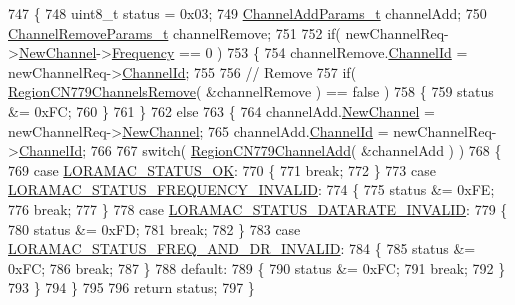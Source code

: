\begin{DoxyCode}
747 \{
748     uint8\_t status = 0x03;
749     \mbox{\hyperlink{structs_channel_add_params}{ChannelAddParams\_t}} channelAdd;
750     \mbox{\hyperlink{structs_channel_remove_params}{ChannelRemoveParams\_t}} channelRemove;
751 
752     \textcolor{keywordflow}{if}( newChannelReq->\mbox{\hyperlink{structs_new_channel_req_params_afc31493a105479490228fd896b20b45c}{NewChannel}}->\mbox{\hyperlink{structs_channel_params_ade3d190636488dad9a89b19446b7acf1}{Frequency}} == 0 )
753     \{
754         channelRemove.\mbox{\hyperlink{structs_channel_remove_params_ae23f953dc29c360e56a3c856404a3276}{ChannelId}} = newChannelReq->\mbox{\hyperlink{structs_new_channel_req_params_ab072d8ed1ab01d956d5b86a9d0185c3f}{ChannelId}};
755 
756         \textcolor{comment}{// Remove}
757         \textcolor{keywordflow}{if}( \mbox{\hyperlink{group___r_e_g_i_o_n_c_n779_ga3ea3d4f5fe7cb25f562f4e6f95396eed}{RegionCN779ChannelsRemove}}( &channelRemove ) == \textcolor{keyword}{false} )
758         \{
759             status &= 0xFC;
760         \}
761     \}
762     \textcolor{keywordflow}{else}
763     \{
764         channelAdd.\mbox{\hyperlink{structs_channel_add_params_afc31493a105479490228fd896b20b45c}{NewChannel}} = newChannelReq->\mbox{\hyperlink{structs_new_channel_req_params_afc31493a105479490228fd896b20b45c}{NewChannel}};
765         channelAdd.\mbox{\hyperlink{structs_channel_add_params_ae23f953dc29c360e56a3c856404a3276}{ChannelId}} = newChannelReq->\mbox{\hyperlink{structs_new_channel_req_params_ab072d8ed1ab01d956d5b86a9d0185c3f}{ChannelId}};
766 
767         \textcolor{keywordflow}{switch}( \mbox{\hyperlink{group___r_e_g_i_o_n_c_n779_ga087a9e4729bae8b825db62caca5f20d2}{RegionCN779ChannelAdd}}( &channelAdd ) )
768         \{
769             \textcolor{keywordflow}{case} \mbox{\hyperlink{group___l_o_r_a_m_a_c_gga1d18f26b344040b3ec5c3db662919661a03db5fca052313edb3823c014b653a74}{LORAMAC\_STATUS\_OK}}:
770             \{
771                 \textcolor{keywordflow}{break};
772             \}
773             \textcolor{keywordflow}{case} \mbox{\hyperlink{group___l_o_r_a_m_a_c_gga1d18f26b344040b3ec5c3db662919661ae3ea7b89796aed5a320013d9743b2955}{LORAMAC\_STATUS\_FREQUENCY\_INVALID}}:
774             \{
775                 status &= 0xFE;
776                 \textcolor{keywordflow}{break};
777             \}
778             \textcolor{keywordflow}{case} \mbox{\hyperlink{group___l_o_r_a_m_a_c_gga1d18f26b344040b3ec5c3db662919661aa910e51ef7a7cf64c27dd3ffe5eb9d38}{LORAMAC\_STATUS\_DATARATE\_INVALID}}:
779             \{
780                 status &= 0xFD;
781                 \textcolor{keywordflow}{break};
782             \}
783             \textcolor{keywordflow}{case} \mbox{\hyperlink{group___l_o_r_a_m_a_c_gga1d18f26b344040b3ec5c3db662919661a163a1a739baee13607068af42f2e9d30}{LORAMAC\_STATUS\_FREQ\_AND\_DR\_INVALID}}:
784             \{
785                 status &= 0xFC;
786                 \textcolor{keywordflow}{break};
787             \}
788             \textcolor{keywordflow}{default}:
789             \{
790                 status &= 0xFC;
791                 \textcolor{keywordflow}{break};
792             \}
793         \}
794     \}
795 
796     \textcolor{keywordflow}{return} status;
797 \}
\end{DoxyCode}
